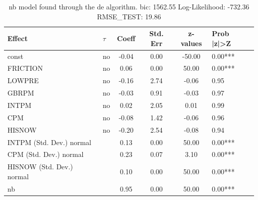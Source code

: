 \begin{table}
	\caption{nb model found through the de algorithm. bic: 1562.55 Log-Likelihood: -732.36 RMSE_TEST: 19.86}
	\begin{center}
		\begin{tabular}{|l|l|c|c|c|l|}
			\hline
			Effect & $\tau$ & Coeff & Std. Err & z-values & Prob |z|>Z \\
			\hline
			const & no & -0.04 & 0.00 & -50.00 & 0.00*** \\
			\hline
			FRICTION & no & 0.06 & 0.00 & 50.00 & 0.00*** \\
			\hline
			LOWPRE & no & -0.16 & 2.74 & -0.06 & 0.95 \\
			\hline
			GBRPM & no & -0.03 & 0.91 & -0.03 & 0.97 \\
			\hline
			INTPM & no & 0.02 & 2.05 & 0.01 & 0.99 \\
			\hline
			CPM & no & -0.08 & 1.42 & -0.06 & 0.96 \\
			\hline
			HISNOW & no & -0.20 & 2.54 & -0.08 & 0.94 \\
			\hline
			INTPM (Std. Dev.) normal &  & 0.13 & 0.00 & 50.00 & 0.00*** \\
			\hline
			CPM (Std. Dev.) normal &  & 0.23 & 0.07 & 3.10 & 0.00*** \\
			\hline
			HISNOW (Std. Dev.) normal &  & 0.10 & 0.00 & 50.00 & 0.00*** \\
			\hline
			nb &  & 0.95 & 0.00 & 50.00 & 0.00*** \\
			\hline
		\end{tabular}
	\end{center}
\end{table}